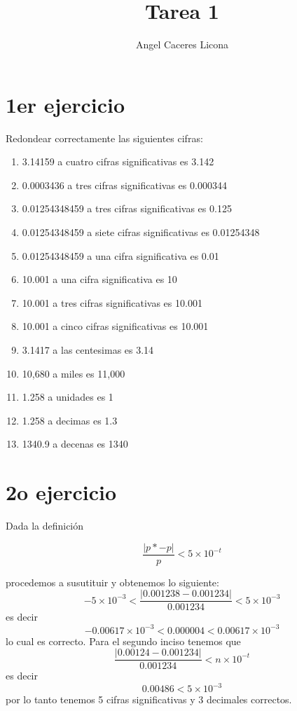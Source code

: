 \documentclass{article}
\begin{document}
\title{Tarea 1}
\author{Angel Caceres Licona}

\maketitle


\section{1er ejercicio}
Redondear correctamente las siguientes cifras:

\begin{enumerate}
    \item 3.14159 a cuatro cifras significativas es 3.142
    \item 0.0003436 a tres cifras significativas es 0.000344
    \item 0.01254348459 a tres cifras significativas es 0.125 
    \item 0.01254348459 a siete cifras significativas es 0.01254348
    \item 0.01254348459 a una cifra significativa es 0.01
    \item 10.001 a una cifra significativa es 10
    \item 10.001 a tres cifras significativas es 10.001
    \item 10.001 a cinco cifras significativas es 10.001
    \item 3.1417 a las centesimas es 3.14
    \item 10,680 a miles es 11,000
    \item 1.258 a unidades es 1
    \item 1.258 a decimas es 1.3
    \item 1340.9 a decenas es 1340
\end{enumerate}

\section{2o ejercicio}

Dada la definición

\begin{equation}
    \frac{|p*-p|}{p}<5 \times 10^{-t}
\end{equation}

procedemos a susutituir y obtenemos lo siguiente:
\begin{equation}
    -5 \times 10^{-3} <\frac{|0.001238-0.001234|}{0.001234}< 5 \times 10^{-3}
\end{equation}
es decir
\begin{equation}
    -0.00617 \times 10^{-3} < 0.000004 < 0.00617 \times 10^{-3}
\end{equation}
lo cual es correcto. Para el segundo inciso tenemos que
\begin{equation}
    \frac{|0.00124-0.001234|}{0.001234}<n \times 10^{-t}
\end{equation}
es decir 
\begin{equation}
    0.00486 < 5 \times 10 ^{-3}
\end{equation}
por lo tanto tenemos 5 cifras significativas y 3 decimales correctos.
\end{document}
